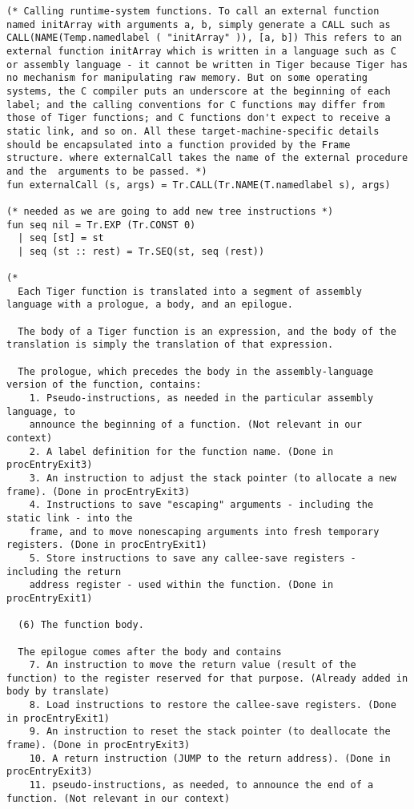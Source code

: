\begin{verbatim}
(* Calling runtime-system functions. To call an external function named initArray with arguments a, b, simply generate a CALL such as CALL(NAME(Temp.namedlabel ( "initArray" )), [a, b]) This refers to an external function initArray which is written in a language such as C or assembly language - it cannot be written in Tiger because Tiger has no mechanism for manipulating raw memory. But on some operating systems, the C compiler puts an underscore at the beginning of each label; and the calling conventions for C functions may differ from those of Tiger functions; and C functions don't expect to receive a static link, and so on. All these target-machine-specific details should be encapsulated into a function provided by the Frame structure. where externalCall takes the name of the external procedure and the  arguments to be passed. *)
fun externalCall (s, args) = Tr.CALL(Tr.NAME(T.namedlabel s), args)

(* needed as we are going to add new tree instructions *)
fun seq nil = Tr.EXP (Tr.CONST 0)
  | seq [st] = st
  | seq (st :: rest) = Tr.SEQ(st, seq (rest))

(* 
  Each Tiger function is translated into a segment of assembly language with a prologue, a body, and an epilogue. 

  The body of a Tiger function is an expression, and the body of the translation is simply the translation of that expression.

  The prologue, which precedes the body in the assembly-language version of the function, contains:
    1. Pseudo-instructions, as needed in the particular assembly language, to 
    announce the beginning of a function. (Not relevant in our context)
    2. A label definition for the function name. (Done in procEntryExit3)
    3. An instruction to adjust the stack pointer (to allocate a new frame). (Done in procEntryExit3)
    4. Instructions to save "escaping" arguments - including the static link - into the
    frame, and to move nonescaping arguments into fresh temporary registers. (Done in procEntryExit1)
    5. Store instructions to save any callee-save registers - including the return 
    address register - used within the function. (Done in procEntryExit1)

  (6) The function body.

  The epilogue comes after the body and contains
    7. An instruction to move the return value (result of the function) to the register reserved for that purpose. (Already added in body by translate)
    8. Load instructions to restore the callee-save registers. (Done in procEntryExit1)
    9. An instruction to reset the stack pointer (to deallocate the frame). (Done in procEntryExit3)
    10. A return instruction (JUMP to the return address). (Done in procEntryExit3)
    11. pseudo-instructions, as needed, to announce the end of a function. (Not relevant in our context)


\end{verbatim}

